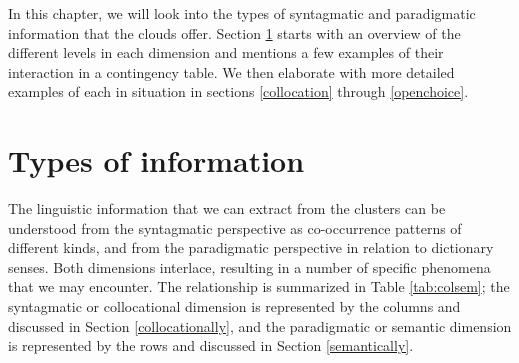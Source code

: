 \documentclass[
]{book}
\begin{document}
In this chapter, we will look into the types of syntagmatic and paradigmatic information that the clouds offer. Section \ref{infotypes} starts with an overview of the different levels in each dimension and mentions a few examples of their interaction in a contingency table. We then elaborate with more detailed examples of each in situation in sections \ref{collocation} through \ref{openchoice}.

\hypertarget{infotypes}{%
\section{Types of information}\label{infotypes}}

The linguistic information that we can extract from the clusters can be understood from the syntagmatic perspective as co-occurrence patterns of different kinds, and from the paradigmatic perspective in relation to dictionary senses. Both dimensions interlace, resulting in a number of specific phenomena that we may encounter. The relationship is summarized in Table \ref{tab:colsem}; the syntagmatic or collocational dimension is represented by the columns and discussed in Section \ref{collocationally}, and the paradigmatic or semantic dimension is represented by the rows and discussed in Section \ref{semantically}.
\end{document}
